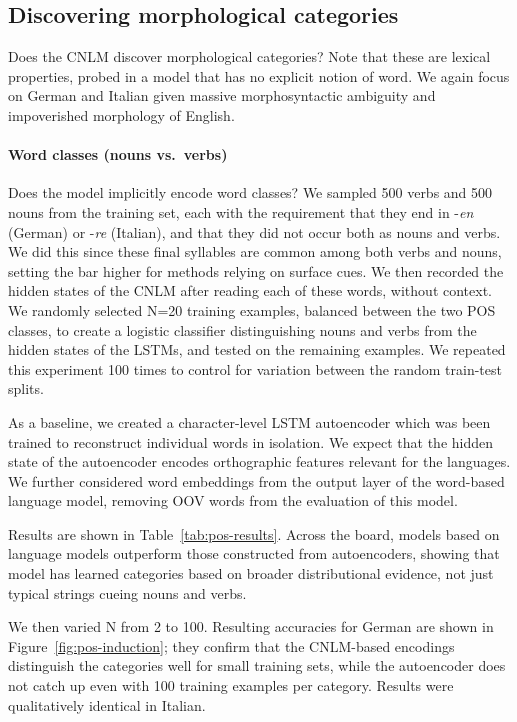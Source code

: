 

\subsection{Discovering morphological categories}
\label{sec:categories}

Does the CNLM discover morphological categories?
Note that these are lexical
properties, probed in a model that has no explicit notion of word.
We again focus on German and Italian given massive morphosyntactic ambiguity
and impoverished morphology of English.

\paragraph{Word classes (nouns vs.~verbs)}

Does the model implicitly encode word classes?
We sampled 500 verbs and 500 nouns from the training set, each with the requirement that they end in -\emph{en} (German) or -\emph{re} (Italian), and that they did not occur both as nouns and verbs.
We did this since these final syllables are common among both verbs and nouns, setting the bar higher for methods relying on surface cues.
We then recorded the hidden states of the CNLM after reading each of these words, without context.
We randomly selected N=20 training examples, balanced between the two POS classes, to create a logistic classifier distinguishing nouns and verbs from the hidden states of the LSTMs, and tested on the remaining examples.
We repeated this experiment 100 times to control for variation between the random train-test splits.

As a baseline, we created a character-level LSTM autoencoder which was been trained to reconstruct individual words in isolation.
We expect that the hidden state of the autoencoder encodes orthographic features relevant for the languages.
We further considered word embeddings from the output layer of the word-based language model, removing OOV words from the evaluation of this model.

Results are shown in Table~\ref{tab:pos-results}.
Across the board, models based on language models outperform those constructed from autoencoders, showing  that model has learned categories based on broader distributional evidence, not just typical strings cueing nouns and verbs.


We then varied N from 2 to 100.
Resulting accuracies for German are shown in Figure~\ref{fig:pos-induction}; they confirm that the CNLM-based encodings distinguish the categories well for small training sets, while the autoencoder does not catch up even with 100 training examples per category.
Results were qualitatively identical in Italian.

